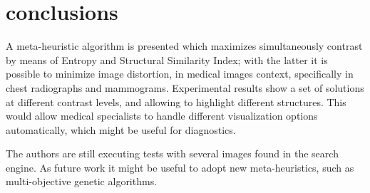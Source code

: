 \documentclass[spanish,twocolumn]{article}
\begin{document}
{\section{conclusions}
\label{sec:conclusion}
A meta-heuristic algorithm is presented which maximizes simultaneously contrast by means of Entropy and Structural Similarity Index; with the latter it is possible to minimize image distortion, in medical images context, specifically in chest radiographs and mammograms. Experimental results show a set of solutions at different contrast levels, and allowing to highlight different structures. This would allow medical specialists to handle different visualization options automatically, which might be useful for diagnostics.

The authors are still executing tests with several images found in the search engine. As future work it might be useful to adopt new meta-heuristics, such as multi-objective genetic algorithms.




\onecolumn
\noindent\begin{minipage}[b]{1.0\linewidth}
  \centering
   

\end{minipage}}
\end{document}
